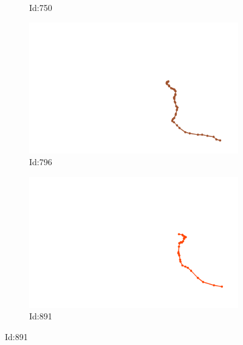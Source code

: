 \documentclass[12pt,twoside]{report}
\begin{document}
\begin{figure}
\begin{subfigure}[b]{0.20\textwidth}
\caption{Id:750}
\end{subfigure}
\begin{subfigure}[b]{0.20\textwidth}
\centering
\includegraphics[width=\textwidth]{../trajectories/796.png}
\caption{Id:796}
\end{subfigure}
\begin{subfigure}[b]{0.20\textwidth}
\centering
\includegraphics[width=\textwidth]{../trajectories/891.png}
\caption{Id:891}
\end{subfigure}
\end{figure}
\end{document}
